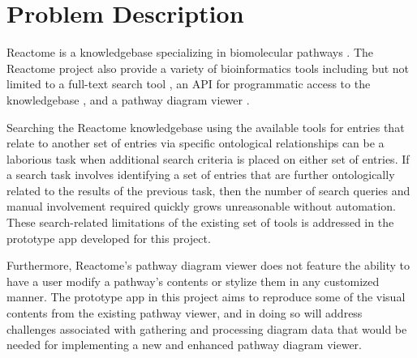 \documentclass[12pt]{report}
\begin{document}

\clearpage


\setcounter{page}{1}

% 
%

% 

\chapter{Problem Description}
\label{ch:Problem Description}

Reactome is a knowledgebase specializing in biomolecular pathways \cite{FabregatAntonio2018RgdE}. The Reactome project also provide a variety of bioinformatics tools including but not limited to a full-text search tool \cite{FabregatA.2016Trpk}, an API for programmatic access to the knowledgebase \cite{ContentServiceGeneralDescription}, and a pathway diagram viewer \cite{PathwayDiagramsSpecifications}.

Searching the Reactome knowledgebase using the available tools for entries that relate to another set of entries via specific ontological relationships can be a laborious task when additional search criteria is placed on either set of entries. If a search task involves identifying a set of entries that are further ontologically related to the results of the previous task, then the number of search queries and manual involvement required quickly grows unreasonable without automation. These search-related limitations of the existing set of tools is addressed in the prototype app developed for this project.

Furthermore, Reactome's pathway diagram viewer does not feature the ability to have a user modify a pathway's contents or stylize them in any customized manner. The prototype app in this project aims to reproduce some of the visual contents from the existing pathway viewer, and in doing so will address challenges associated with gathering and processing diagram data that would be needed for implementing a new and enhanced pathway diagram viewer.
\end{document}
